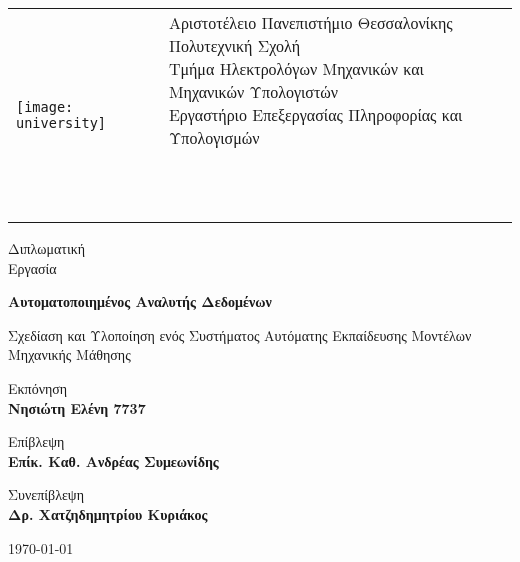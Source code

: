 \begin{titlepage}
	
\begin{tabular}{ll}
	\texttt{[image: university]} &\makecell[l]{ \small Αριστοτέλειο Πανεπιστήμιο Θεσσαλονίκης\\Πολυτεχνική Σχολή\\Τμήμα Ηλεκτρολόγων Μηχανικών και Μηχανικών Υπολογιστών\\Εργαστήριο Επεξεργασίας Πληροφορίας και Υπολογισμών\\
		\\
		\\ \\}
\end{tabular}
\begin{center}	

			
		\vspace{1cm}
		
		\LARGE
		Διπλωματική\\
		Εργασία		
		\vspace{0.3cm}
		
		\Huge
		\textbf{Αυτοματοποιημένος Αναλυτής Δεδομένων}
		
		\vspace{0.3cm}
		\LARGE
		Σχεδίαση και Υλοποίηση ενός Συστήματος Αυτόματης Εκπαίδευσης Μοντέλων Μηχανικής Μάθησης
		
		\vspace{1.5cm}
		
		Εκπόνηση \\
		\textbf{Νησιώτη Ελένη 7737}
		
		\vspace{1.5cm}
		
		Επίβλεψη \\
		\textbf{Επίκ. Καθ. Ανδρέας Συμεωνίδης}
		
		Συνεπίβλεψη \\
		\textbf{Δρ. Χατζηδημητρίου Κυριάκος}
		
		\vspace{1cm}
					
		\today

		
	\end{center}
\end{titlepage}

